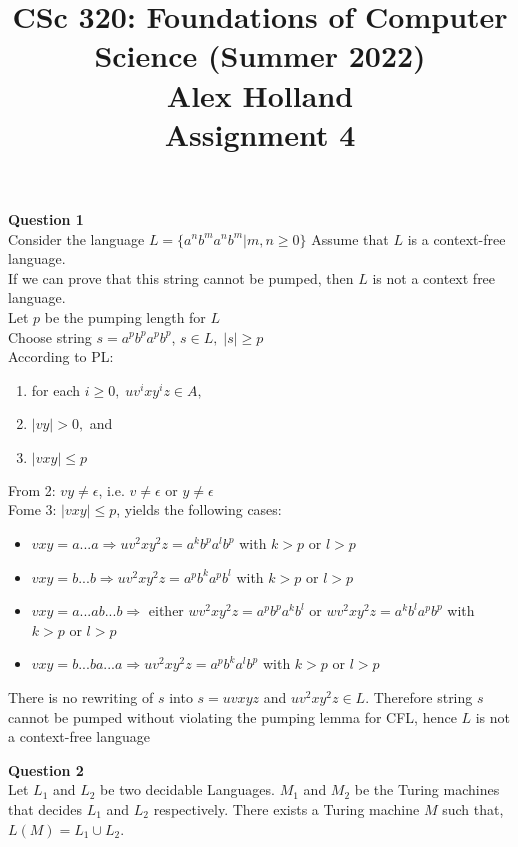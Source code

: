 \documentclass{article}
\title{%
   CSc 320: Foundations of Computer Science (Summer 2022)\\
    \Large Alex Holland \\
    Assignment 4\\
    }
\date{}
\begin{document}
\maketitle

{\bf Question 1}\\
Consider the language $L = \{a^nb^ma^nb^m | m, n \geq 0 \}$ Assume that $L$ is a context-free language.\\
If we can prove that this string cannot be pumped, then $L$ is not a context free language.\\
Let $p$ be the pumping length for $L$\\
Choose string $s = a^pb^pa^pb^p$, $s \in L, \; |s| \geq p$\\

According to PL:
\begin{enumerate}
  \item for each $i \geq 0, \; uv^ixy^iz \in A,$
  \item $|vy| > 0,$ and
  \item $|vxy| \leq p$
\end{enumerate}

From 2: $vy \neq \epsilon$, i.e. $v \neq \epsilon$ or $y \neq \epsilon$\\

Fome 3: $|vxy| \leq p$, yields the following cases:
\begin{itemize}
    \item $vxy = a...a \Longrightarrow uv^2xy^2z = a^kb^pa^lb^p$ with $k > p$ or $l > p$
    \item $vxy = b...b \Longrightarrow uv^2xy^2z = a^pb^ka^pb^l$ with $k > p$ or $l > p$
    \item $vxy = a...ab...b \Longrightarrow$ either $wv^2xy^2z = a^pb^pa^kb^l$ or $wv^2xy^2z = a^kb^la^pb^p$ with $k > p$ or $l > p$
    \item $vxy = b...ba...a \Longrightarrow uv^2xy^2z = a^pb^ka^lb^p$ with $k > p$ or $l > p$
\end{itemize}


There is no rewriting of $s$ into $s = uvxyz$ and $uv^2xy^2z \in L$. Therefore string $s$ cannot be pumped without violating the pumping lemma for CFL, hence $L$ is not a context-free language


\break
{\bf Question 2}\\
Let $L_1$ and $L_2$ be two decidable Languages. $M_1$ and $M_2$ be the Turing machines that decides $L_1$ and $L_2$ respectively.
There exists a Turing machine $M$ such that, $L(M) = L_1 \cup L_2$.\\
\end{document}
